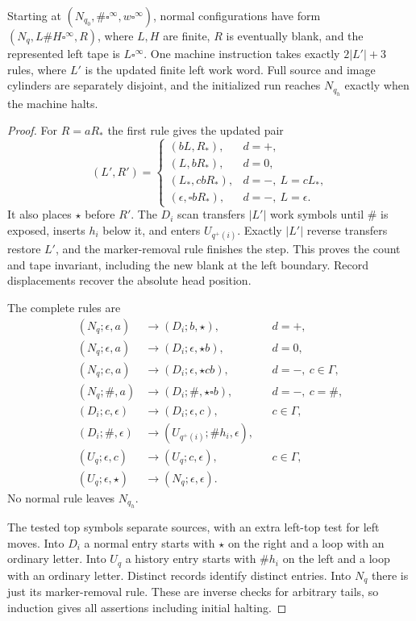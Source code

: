 \begin{lemma}\label{lem:sa-delimiter}
Starting at $(N_{q_0},\#\square^\infty,w\square^\infty)$, normal
configurations have form $(N_q,L\#H\square^\infty,R)$, where $L,H$
are finite, $R$ is eventually blank, and the represented left tape is
$L\square^\infty$.  One machine instruction takes exactly $2|L'|+3$
rules, where $L'$ is the updated finite left work word.  Full source
and image cylinders are separately disjoint, and the initialized run
reaches $N_{q_h}$ exactly when the machine halts.
\end{lemma}
\begin{proof}
For $R=aR_*$ the first rule gives the updated pair
\[
 (L',R')=\begin{cases}
 (bL,R_*),&d=+,\\
 (L,bR_*),&d=0,\\
 (L_*,cbR_*),&d=-,\ L=cL_*,\\
 (\epsilon,\square bR_*),&d=-,\ L=\epsilon.
 \end{cases}
\]
It also places $\star$ before $R'$.  The $D_i$ scan transfers $|L'|$
work symbols until $\#$ is exposed, inserts $h_i$ below it, and enters
$U_{q^+(i)}$.  Exactly $|L'|$ reverse transfers restore $L'$, and the
marker-removal rule finishes the step.  This proves the count and tape
invariant, including the new blank at the left boundary.  Record
displacements recover the absolute head position.

The complete rules are
\begin{equation}\label{eq:sa-delimiter-table}
\begin{aligned}
 (N_q;\epsilon,a)&\to(D_i;b,\star),&&d=+,\\
 (N_q;\epsilon,a)&\to(D_i;\epsilon,\star b),&&d=0,\\
 (N_q;c,a)&\to(D_i;\epsilon,\star cb),&&d=-,\ c\in\Gamma,\\
 (N_q;\#,a)&\to(D_i;\#,\star\square b),&&d=-,\ c=\#,\\
 (D_i;c,\epsilon)&\to(D_i;\epsilon,c),&&c\in\Gamma,\\
 (D_i;\#,\epsilon)&\to(U_{q^+(i)};\#h_i,\epsilon),\\
 (U_q;\epsilon,c)&\to(U_q;c,\epsilon),&&c\in\Gamma,\\
 (U_q;\epsilon,\star)&\to(N_q;\epsilon,\epsilon).
\end{aligned}
\end{equation}
No normal rule leaves $N_{q_h}$.

The tested top symbols separate sources, with an extra left-top test
for left moves.  Into $D_i$ a normal entry starts with $\star$ on the
right and a loop with an ordinary letter.  Into $U_q$ a history entry
starts with $\#h_i$ on the left and a loop with an ordinary letter.
Distinct records identify distinct entries.  Into $N_q$ there is just
its marker-removal rule.  These are inverse checks for arbitrary tails,
so induction gives all assertions including initial halting.
\end{proof}

